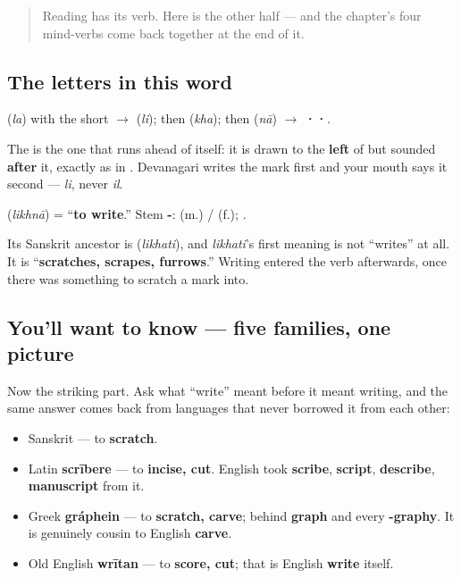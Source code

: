 \begin{quote}
Reading has its verb. Here is the other half — and the chapter's four mind-verbs come back together at the end of it.
\end{quote}

\subsection*{The letters in this word}
\textbf{} (\emph{la}) with the short \textbf{} $\to$ \textbf{} (\emph{li}); then \textbf{} (\emph{kha}); then \textbf{} (\emph{nā}) $\to$ \textbf{··}.

The \textbf{} is the one that runs ahead of itself: it is drawn to the \textbf{left} of \textbf{} but sounded \textbf{after} it, exactly as in \textbf{}. Devanagari writes the mark first and your mouth says it second — \emph{li}, never \emph{il}.

\begin{cousinweb}
\textbf{} (\emph{likhnā}) = \textquotedblleft{}\textbf{to write}.\textquotedblright{} Stem \textbf{-}: \textbf{  } (m.) / \textbf{  } (f.); \textbf{  }.

Its Sanskrit ancestor is \textbf{} (\emph{likhati}), and \emph{likhati}'s first meaning is not \textquotedblleft{}writes\textquotedblright{} at all. It is \textquotedblleft{}\textbf{scratches, scrapes, furrows}.\textquotedblright{} Writing entered the verb afterwards, once there was something to scratch a mark into.
\end{cousinweb}

\subsection*{You'll want to know — five families, one picture}
Now the striking part. Ask what \textquotedblleft{}write\textquotedblright{} meant before it meant writing, and the same answer comes back from languages that never borrowed it from each other:

\begin{itemize}
\raggedright
  \item Sanskrit \textbf{} — to \textbf{scratch}.
  \item Latin \textbf{scrībere} — to \textbf{incise, cut}. English took \textbf{scribe}, \textbf{script}, \textbf{describe}, \textbf{manuscript} from it.
  \item Greek \textbf{gráphein} — to \textbf{scratch, carve}; behind \textbf{graph} and every \textbf{-graphy}. It is genuinely cousin to English \textbf{carve}.
  \item Old English \textbf{wrītan} — to \textbf{score, cut}; that is English \textbf{write} itself.
\end{itemize}

